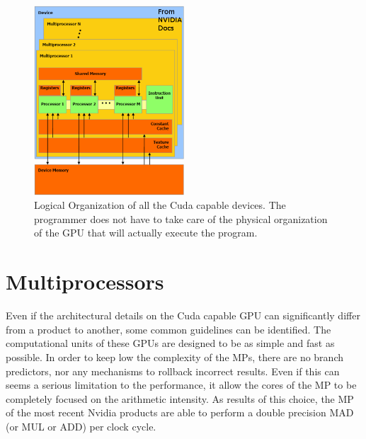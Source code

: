 \begin{figure}[h!bt]
	\centerline{\includegraphics[width=0.5\textwidth]{img/HWModel.png}}
	\caption{Logical Organization of all the Cuda capable devices. The programmer does not have to take care of the physical organization of the GPU that will actually execute the program.}
	\label{fig:NvidiaGPUsLogicalOrg}
\end{figure}

\section{Multiprocessors}
Even if the architectural details on the Cuda capable GPU can significantly differ from a product to another, some common guidelines can be identified. The computational units of these GPUs are designed to be as simple and fast as possible. In order to keep low the complexity of the MPs, there are no branch predictors, nor any mechanisms to rollback incorrect results. Even if this can seems a serious limitation to the performance, it allow the cores of the MP to be completely focused on the arithmetic intensity. As results of this choice, the MP of the most recent Nvidia products are able to perform a double precision MAD (or MUL or ADD) per clock cycle.\\

